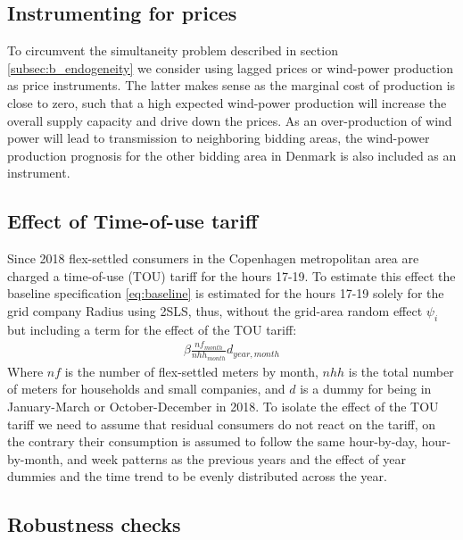 \subsection{Instrumenting for prices}
\label{subsec:instruments}
To circumvent the simultaneity problem described in section \ref{subsec:b_endogeneity} we consider using lagged prices or wind-power production as price instruments. The latter makes sense as the marginal cost of production is close to zero, such that a high expected wind-power production will increase the overall supply capacity and drive down the prices. As an over-production of wind power will lead to transmission to neighboring bidding areas, the wind-power production prognosis for the other bidding area in Denmark is also included as an instrument.

\subsection{Effect of Time-of-use tariff}
Since 2018 flex-settled consumers in the Copenhagen metropolitan area are charged a time-of-use (TOU) tariff for the hours 17-19. To estimate this effect the baseline specification \ref{eq:baseline} is estimated for the hours 17-19 solely for the grid company Radius using 2SLS, thus, without the grid-area random effect $\psi_i$ but including a term for the effect of the TOU tariff:
\begin{align}
  \beta\frac{nf_{month}}{nhh_{month}}d_{year,month}
  \label{eq:tout}
\end{align}
Where $nf$ is the number of flex-settled meters by month, $nhh$ is the total number of meters for households and small companies, and $d$ is a dummy for being in January-March or October-December in 2018. To isolate the effect of the TOU tariff we need to assume that residual consumers do not react on the tariff, on the contrary their consumption is assumed to follow the same hour-by-day, hour-by-month, and week patterns as the previous years and the effect of year dummies and the time trend to be evenly distributed across the year.



\subsection{Robustness checks}
\label{subsec:robustness}
